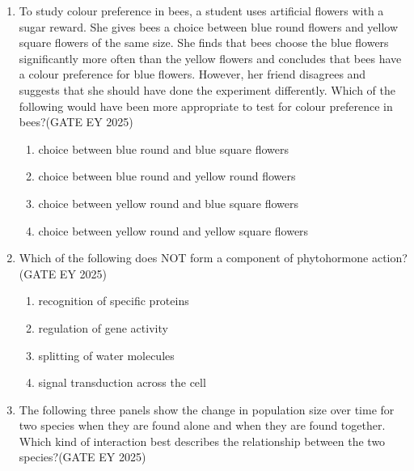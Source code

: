 \begin{enumerate}[leftmargin=*,label=\textbf{Q.\arabic*},resume]

\item To study colour preference in bees, a student uses artificial flowers with a sugar reward. She gives bees a choice between blue round flowers and yellow square flowers of the same size. She finds that bees choose the blue flowers significantly more often than the yellow flowers and concludes that bees have a colour preference for blue flowers. However, her friend disagrees and suggests that she should have done the experiment differently. Which of the following would have been more appropriate to test for colour preference in bees?\hfill {(GATE EY 2025)}
\begin{multicols}{2}
\begin{enumerate}
\item choice between blue round and blue square flowers
\item choice between blue round and yellow round flowers
\item choice between yellow round and blue square flowers
\item choice between yellow round and yellow square flowers
\end{enumerate}
\end{multicols}

\item Which of the following does NOT form a component of phytohormone action?\hfill {(GATE EY 2025)}
\begin{multicols}{2}
\begin{enumerate}
\item recognition of specific proteins
\item regulation of gene activity
\item splitting of water molecules
\item signal transduction across the cell
\end{enumerate}
\end{multicols}

\item The following three panels show the change in population size over time for two species when they are found alone and when they are found together. Which kind of interaction best describes the relationship between the two species?\hfill {(GATE EY 2025)}


\end{enumerate}
